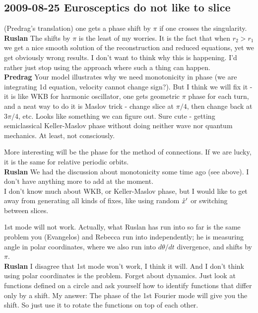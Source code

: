 \subsection{2009-08-25 Eurosceptics do not like to slice}
 (Predrag's translation) one gets a
phase shift by $\pi$ if one crosses the singularity.
\\
{\bf Ruslan} The shifts by $\pi$ is the least of my worries.
It is the fact that when $r_2 > r_1$ we get a nice smooth
solution of the reconstruction and reduced equations, yet we
get obviously wrong results.  I don't want to think why this
is happening.  I'd rather just stop using the approach where
such a thing can happen.
\\
{\bf Predrag} Your model illustrates why we need
monotonicity in phase (we are integrating 1d equation,
velocity cannot change sign?). But I think we will fix it -
it is like WKB for harmonic oscillator, one gets geometric
$\pi$ phase for each turn, and a neat way to do it is Maslov
trick - change slice at $\pi/4$, then change back at
$3\pi/4$, etc. Looks like something we can figure out. Sure
cute - getting semiclassical Keller-Maslov phase without
doing neither wave nor quantum mechanics. At least, not
consciously.

More interesting will be the phase for the method of
connections. If we are lucky, it is the same for relative
periodic orbits.
\\
{\bf Ruslan} We had the discussion about monotonicity some
time ago (see above).  I don't have anything more to add at
the moment.
\\
I don't know much about WKB, or Keller-Maslov
phase, but I would like to get away from generating all kinds
of fixes, like using random ${\hat{x}'}$ or switching between
slices.

\medskip{} 1st mode will not work. Actually,
what Ruslan has run into so far is the same problem you
(Evangelos) and Rebecca run into independently; he is
measuring angle in polar coordinates, where we also run into
$d\theta/dt$ divergence, and shifts by $\pi$.
\\
{\bf Ruslan} I disagree that 1st mode won't work, I think it
will. And I don't think using polar coordinates is the
problem.  Forget about dynamics.  Just look at functions
defined on a circle and ask yourself how to identify
functions that differ only by a shift.  My answer: The phase
of the 1st Fourier mode will give you the shift.  So just use
it to rotate the functions on top of each other.

